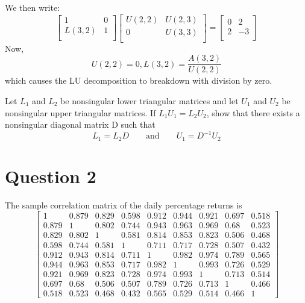 \documentclass{article}
\DeclareMathOperator{\1}{\mathit{1}}
\numberwithin{figure}{section} %
\begin{document}
We then write:
    \[
        \begin{bmatrix}
            1 & 0 \\
            L(3,2) & 1 \\
        \end{bmatrix}
        \begin{bmatrix}
            U(2,2) & U(2,3) \\
            0 & U(3,3) \\
        \end{bmatrix} =
        \begin{bmatrix}
            0 & 2 \\
            2 & -3 \\
        \end{bmatrix}
    \]
Now,
    \[
        U(2,2) = 0, L(3,2) = \frac{A(3,2)}{U(2,2)}
    \]
which causes the LU decomposition to breakdown with division by zero.



Let $L_1$ and $L_2$ be nonsingular lower triangular matrices and let $U_1$ and $U_2$ be nonsingular upper triangular matrices. If $L_1U_1 = L_2U_2$, show that there exists a nonsingular diagonal matrix D such that 
\begin{equation} \label{eq:1}
L_1 = L_2D \qquad \mathrm{and} \qquad U_1 = D^{-1}U_2
\end{equation}

\section{Question 2}

The sample correlation matrix of the daily percentage returns is
	\[
	\begin{bmatrix}
	1 & 0.879 & 0.829 & 0.598 & 0.912 & 0.944 & 0.921 & 0.697 & 0.518\\
0.879 & 1 & 0.802 & 0.744 & 0.943 & 0.963 & 0.969 & 0.68 & 0.523\\
0.829 & 0.802 & 1 & 0.581 & 0.814 & 0.853 & 0.823 & 0.506 & 0.468\\
0.598 & 0.744 & 0.581 & 1 & 0.711 & 0.717 & 0.728 & 0.507 & 0.432\\
0.912 & 0.943 & 0.814 & 0.711 & 1 & 0.982 & 0.974 & 0.789 & 0.565\\
0.944 & 0.963 & 0.853 & 0.717 & 0.982 & 1 & 0.993 & 0.726 & 0.529\\
0.921 & 0.969 & 0.823 & 0.728 & 0.974 & 0.993 & 1 & 0.713 & 0.514\\
0.697 & 0.68 & 0.506 & 0.507 & 0.789 & 0.726 & 0.713 & 1 & 0.466\\
0.518 & 0.523 & 0.468 & 0.432 & 0.565 & 0.529 & 0.514 & 0.466 & 1
	\end{bmatrix}
	\]
	
\end{document}
